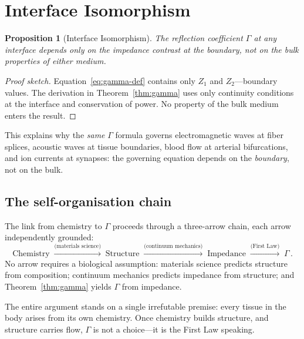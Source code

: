 \documentclass[aps,pre,twocolumn,superscriptaddress,floatfix]{revtex4-2}
\newtheorem{proposition}{Proposition}
\begin{document}
\section{Interface Isomorphism}
\label{sec:isomorphism}

\begin{proposition}[Interface Isomorphism]
\label{prop:isomorphism}
The reflection coefficient $\Gamma$ at any interface
depends only on the impedance contrast at the boundary,
not on the bulk properties of either medium.
\end{proposition}

\begin{proof}[Proof sketch]
Equation~\eqref{eq:gamma-def} contains only $Z_1$ and
$Z_2$---boundary values.  The derivation in
Theorem~\ref{thm:gamma} uses only continuity conditions
at the interface and conservation of power.
No property of the bulk medium enters the result.
\end{proof}

This explains why the \emph{same} $\Gamma$ formula governs
electromagnetic waves at fiber splices, acoustic waves at
tissue boundaries, blood flow at arterial bifurcations,
and ion currents at synapses: the governing equation
depends on the \emph{boundary}, not on the bulk.

\subsection{The self-organisation chain}

The link from chemistry to $\Gamma$ proceeds through a
three-arrow chain, each arrow independently grounded:
\[
  \text{Chemistry} \;\xrightarrow{\text{(materials science)}}
  \;\text{Structure}
  \;\xrightarrow{\text{(continuum mechanics)}}
  \;\text{Impedance}
  \;\xrightarrow{\text{(First Law)}}
  \;\Gamma\,.
\]
No arrow requires a biological assumption:
materials science predicts structure from
composition; continuum mechanics predicts impedance
from structure; and Theorem~\ref{thm:gamma} yields
$\Gamma$ from impedance.

The entire argument stands on a single irrefutable
premise: every tissue in the body arises from its
own chemistry.  Once chemistry builds structure, and
structure carries flow, $\Gamma$ is not a choice---it
is the First Law speaking.


\end{document}
